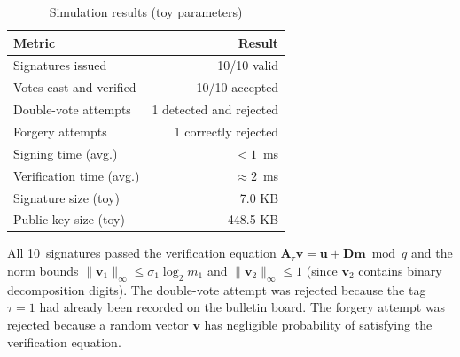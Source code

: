 \documentclass[a4paper]{article}
\newcommand{\inorm}[1]{\|#1\|_\infty}
\begin{document}
\begin{table}[H]
    \centering
    \caption{Simulation results (toy parameters)}
    \begin{tabular}{lr}
        \toprule
        \textbf{Metric}          & \textbf{Result}         \\
        \midrule
        Signatures issued        & 10/10 valid             \\
        Votes cast and verified  & 10/10 accepted          \\
        Double-vote attempts     & 1 detected and rejected \\
        Forgery attempts         & 1 correctly rejected    \\
        Signing time (avg.)      & $< 1$~ms                \\
        Verification time (avg.) & $\approx 2$~ms          \\
        Signature size (toy)     & 7.0 KB                  \\
        Public key size (toy)    & 448.5 KB                \\
        \bottomrule
    \end{tabular}
\end{table}

All 10~signatures passed the verification equation $\mathbf{A}_\tau \mathbf{v} = \mathbf{u} + \mathbf{D}\mathbf{m} \bmod q$ and the norm bounds $\inorm{\mathbf{v}_1} \leq \sigma_1 \log_2 m_1$ and $\inorm{\mathbf{v}_2} \leq 1$ (since $\mathbf{v}_2$ contains binary decomposition digits). The double-vote attempt was rejected because the tag $\tau = 1$ had already been recorded on the bulletin board. The forgery attempt was rejected because a random vector $\mathbf{v}$ has negligible probability of satisfying the verification equation.
\end{document}
